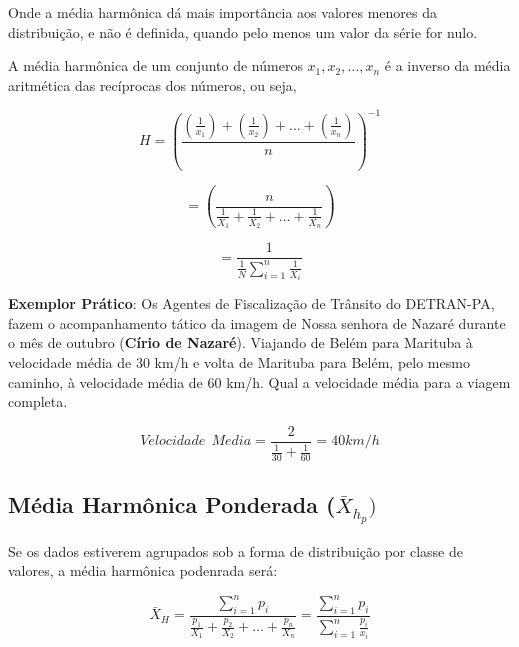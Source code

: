 Onde a média harmônica dá mais importância aos valores menores da distribuição, e não é definida, quando pelo menos um valor da série for nulo.\vskip0.3cm


A média harmônica de um conjunto de números $x_{1},x_{2},\ldots,x_{n}$ é a inverso da média
aritmética das recíprocas dos números, ou seja,


\begin{equation}\label{harmonica1}
H=(\frac{(\frac{1}{x_{1}})+(\frac{1}{x_{2}})+\ldots+(\frac{1}{x_{n}})}{n})^{-1}
\end{equation}

\begin{equation*}\label{harmonica1}
 =(\frac{n}{\frac{1}{X_{1}}+\frac{1}{X_{2}}+\ldots+\frac{1}{X_{n}}})
\end{equation*}

\begin{equation*}\label{harmonica}
=\frac{1}{\frac{1}{N}\sum_{i=1}^{n}\frac{1}{X_{i}}}
\end{equation*}

\vskip0.3cm

\textbf{Exemplor Prático}: Os Agentes de Fiscalização de Trânsito do DETRAN-PA, fazem o acompanhamento tático da imagem de Nossa senhora de Nazaré durante o mês de outubro (\textbf{Círio de Nazaré}). Viajando de Belém para Marituba à velocidade média de 30 km/h e volta de Marituba para Belém, pelo mesmo caminho, à velocidade média de 60 km/h. Qual a velocidade média para a viagem completa.

\begin{equation}\label{exemplo_harmonica}
Velocidade \ \  Media = \frac{2}{\frac{1}{30}+\frac{1}{60}} = 40 km/h
\end{equation}


\subsection{Média Harmônica Ponderada ($\bar{X}_{h_{p}})$}


Se os dados estiverem agrupados sob a forma de distribuição por classe de valores, a média harmônica podenrada será:


\begin{equation}\label{harmonicapondrada}
    \bar{X}_{H}=\frac{\sum_{i=1}^{n}p_{i}}{\frac{p_{1}}{X_{1}}+\frac{p_{2}}{X_{2}}+\ldots+\frac{p_{n}}{X_{n}}}=\frac{\sum_{i=1}^{n}p_{i}}{\sum_{i=1}^{n}\frac{p_{i}}{x_{i}}}
\end{equation}


